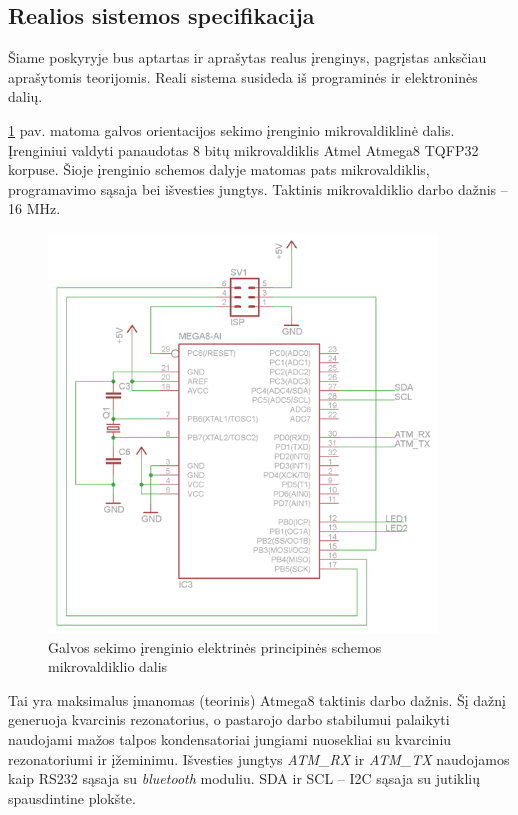 \documentclass[]{vgtuef}
\begin{document}
\subsection{Realios sistemos specifikacija}
\label{sec:realios_sistemos_specifikacija}

Šiame poskyryje bus aptartas ir aprašytas realus įrenginys, pagrįstas anksčiau aprašytomis teorijomis. Reali sistema susideda iš programinės ir elektroninės dalių.

\ref{fig:headtracker_schematic} pav. matoma galvos orientacijos sekimo įrenginio mikrovaldiklinė dalis. Įrenginiui valdyti panaudotas 8 bitų mikrovaldiklis Atmel Atmega8 TQFP32 korpuse. Šioje įrenginio schemos dalyje matomas pats mikrovaldiklis, programavimo sąsaja bei išvesties jungtys. Taktinis mikrovaldiklio darbo dažnis – 16 MHz.

\begin{figure}[htbp]
  \centering
  \includegraphics[width=390px]{img/headtracker_schematic.png}
  \caption{Galvos sekimo įrenginio elektrinės principinės schemos mikrovaldiklio dalis}
  \label{fig:headtracker_schematic}
\end{figure}

Tai yra maksimalus įmanomas (teorinis) Atmega8 taktinis darbo dažnis. Šį dažnį generuoja kvarcinis rezonatorius, o pastarojo darbo stabilumui palaikyti naudojami mažos talpos kondensatoriai jungiami nuosekliai su kvarciniu rezonatoriumi ir įžeminimu. Išvesties jungtys \textit{ATM\_RX} ir \textit{ATM\_TX} naudojamos kaip RS232 sąsaja su \textit{bluetooth} moduliu. SDA ir SCL – I2C  sąsaja su jutiklių spausdintine plokšte.
\end{document}
